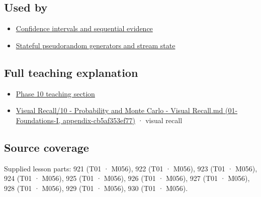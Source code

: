 \subsection{Used by}\label{appendix-a2360b435383-used-by}

\begin{itemize}
\tightlist
\item
  \hyperref[appendix-c83016554b1e]{Confidence intervals and sequential evidence}
\item
  \hyperref[appendix-e0f7c7e08f3a]{Stateful pseudorandom generators and stream state}
\end{itemize}

\subsection{Full teaching explanation}\label{appendix-a2360b435383-full-teaching-explanation}

\begin{itemize}
\tightlist
\item
  \hyperref[02-foundations-ii-ch023-discrete-and-continuous-distribution-families]{Phase 10 teaching section}
\item
  \href{../01-Foundations-I/main.pdf\#nameddest=appendix-cb5af353ef77}{Visual Recall/10 - Probability and Monte Carlo - Visual Recall.md (01-Foundations-I, appendix-cb5af353ef77)} · visual recall
\end{itemize}

\subsection{Source coverage}\label{appendix-a2360b435383-source-coverage}

Supplied lesson parts: 921 (T01 · M056), 922 (T01 · M056), 923 (T01 · M056), 924 (T01 · M056), 925 (T01 · M056), 926 (T01 · M056), 927 (T01 · M056), 928 (T01 · M056), 929 (T01 · M056), 930 (T01 · M056).

